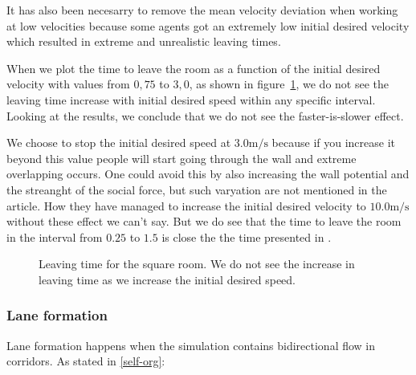 It has also been necesarry to remove the mean velocity deviation 
when working at low velocities because some agents got an extremely 
low initial desired velocity which resulted in extreme and unrealistic 
leaving times.

When we plot the time to leave the room as a function of the initial 
desired velocity with values from $0,75$ to $3,0$, as shown in 
figure~\ref{fig:square-room-leaving}, we do not see the leaving 
time increase with initial desired speed within any specific interval. 
Looking at the results, we conclude that we do not see the faster-is-slower 
effect.

We choose to stop the initial desired speed at $3.0 \text{m}/\text{s}$ 
because if you increase it beyond this value people will start 
going through the wall and extreme overlapping occurs. One could 
avoid this by also increasing the wall potential and the 
streanght of the social force, but such varyation are not 
mentioned in the article. How they have managed to increase 
the initial desired velocity to $10.0 \text{m}/\text{s}$ without 
these effect we can't say. But we do see that the time to leave the 
room in the interval from $0.25$ to $1.5$ is close the the time 
presented in \cite{helbing00}. 

\begin{figure}[ht]
    \centering
\caption[Leaving time for the square room]{Leaving time for the square 
    room. We do not see the increase in leaving time as we increase the initial 
    desired speed.}
    \label{fig:square-room-leaving}
\end{figure}

\subsubsection{Lane formation}
Lane formation happens when the simulation contains bidirectional flow in 
corridors. As stated in \ref{self-org}:

